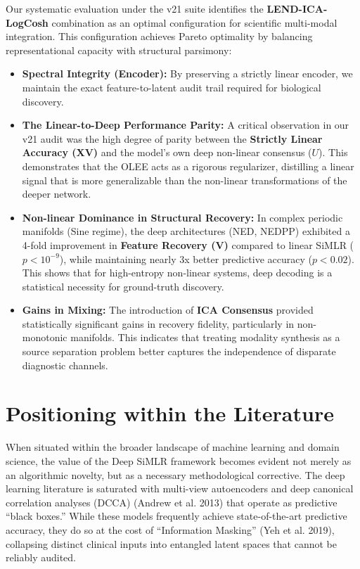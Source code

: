 \documentclass[
  letterpaper,
]{report}
\providecommand{\tightlist}{%
  \setlength{\itemsep}{0pt}\setlength{\parskip}{0pt}}
\begin{document}
Our systematic evaluation under the v21 suite identifies the
\textbf{LEND-ICA-LogCosh} combination as an optimal configuration for
scientific multi-modal integration. This configuration achieves Pareto
optimality by balancing representational capacity with structural
parsimony:

\begin{itemize}
\tightlist
\item
  \textbf{Spectral Integrity (Encoder):} By preserving a strictly linear
  encoder, we maintain the exact feature-to-latent audit trail required
  for biological discovery.
\item
  \textbf{The Linear-to-Deep Performance Parity:} A critical observation
  in our v21 audit was the high degree of parity between the
  \textbf{Strictly Linear Accuracy (XV)} and the model's own deep
  non-linear consensus (\(U\)). This demonstrates that the OLEE acts as
  a rigorous regularizer, distilling a linear signal that is more
  generalizable than the non-linear transformations of the deeper
  network.
\item
  \textbf{Non-linear Dominance in Structural Recovery:} In complex
  periodic manifolds (Sine regime), the deep architectures (NED, NEDPP)
  exhibited a 4-fold improvement in \textbf{Feature Recovery (V)}
  compared to linear SiMLR (\(p < 10^{-9}\)), while maintaining nearly
  3x better predictive accuracy (\(p < 0.02\)). This shows that for
  high-entropy non-linear systems, deep decoding is a statistical
  necessity for ground-truth discovery.
\item
  \textbf{Gains in Mixing:} The introduction of \textbf{ICA Consensus}
  provided statistically significant gains in recovery fidelity,
  particularly in non-monotonic manifolds. This indicates that treating
  modality synthesis as a source separation problem better captures the
  independence of disparate diagnostic channels.
\end{itemize}

\section{Positioning within the
Literature}\label{positioning-within-the-literature}

When situated within the broader landscape of machine learning and
domain science, the value of the Deep SiMLR framework becomes evident
not merely as an algorithmic novelty, but as a necessary methodological
corrective. The deep learning literature is saturated with multi-view
autoencoders and deep canonical correlation analyses (DCCA) (Andrew et
al. 2013) that operate as predictive ``black boxes.'' While these models
frequently achieve state-of-the-art predictive accuracy, they do so at
the cost of ``Information Masking'' (Yeh et al. 2019), collapsing
distinct clinical inputs into entangled latent spaces that cannot be
reliably audited.
\end{document}
